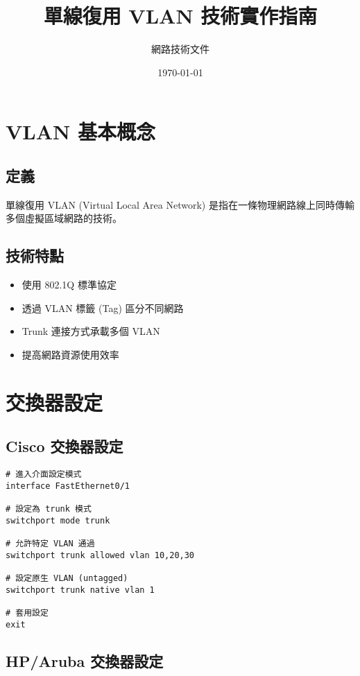 \documentclass[12pt,a4paper]{article}
\title{單線復用 VLAN 技術實作指南}
\author{網路技術文件}
\date{\today}
\begin{document}
\maketitle

\tableofcontents
\newpage

\section{VLAN 基本概念}

\subsection{定義}
單線復用 VLAN (Virtual Local Area Network) 是指在一條物理網路線上同時傳輸多個虛擬區域網路的技術。

\subsection{技術特點}
\begin{itemize}
    \item 使用 802.1Q 標準協定
    \item 透過 VLAN 標籤 (Tag) 區分不同網路
    \item Trunk 連接方式承載多個 VLAN
    \item 提高網路資源使用效率
\end{itemize}

\section{交換器設定}

\subsection{Cisco 交換器設定}

\begin{lstlisting}[caption=Cisco Trunk 設定]
# 進入介面設定模式
interface FastEthernet0/1

# 設定為 trunk 模式
switchport mode trunk

# 允許特定 VLAN 通過
switchport trunk allowed vlan 10,20,30

# 設定原生 VLAN (untagged)
switchport trunk native vlan 1

# 套用設定
exit
\end{lstlisting}

\subsection{HP/Aruba 交換器設定}
\end{document}
